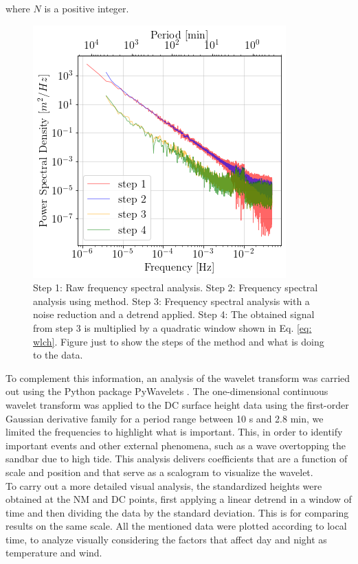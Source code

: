\documentclass[tesis.tex]{subfiles}
\begin{document}
where $N$ is a positive integer.

\begin{figure}[h!]
    \centering
    \includegraphics[scale=0.5]{Imagenes/steps_freq.png}
    \caption{Step 1: Raw frequency spectral analysis. Step 2: Frequency spectral analysis using \cite{welch1967use} method. Step 3: Frequency spectral analysis with a noise reduction and a detrend applied. Step 4: The obtained signal from step 3 is multiplied by a quadratic window shown in Eq. \ref{eq: wlch}. Figure just to show the steps of the method and what is doing to the data.}
    \label{fig:steps_freq}
\end{figure}

To complement this information, an analysis of the wavelet transform was carried out using the Python package PyWavelets \citep{lee2019pywavelets}. The one-dimensional continuous wavelet transform was applied to the DC surface height data using the first-order Gaussian derivative family for a period range between 10 s and 2.8 min, we limited the frequencies to highlight what is important. This, in order to identify important events and other external phenomena, such as a wave overtopping the sandbar due to high tide. This analysis delivers coefficients that are a function of scale and position and that serve as a scalogram to visualize the wavelet.\\

To carry out a more detailed visual analysis, the standardized heights were obtained at the NM and DC points, first applying a linear detrend in a window of time and then dividing the data by the standard deviation. This is for comparing results on the same scale. All the mentioned data were plotted according to local time, to analyze visually considering the factors that affect day and night as temperature and wind.
\end{document}
